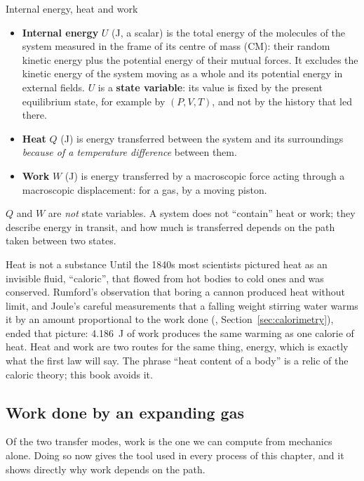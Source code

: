 \begin{defbox}{Internal energy, heat and work}
\begin{itemize}
\item \textbf{Internal energy} $U$ (\si{J}, a scalar) is the total energy of the molecules of the system
      measured in the frame of its centre of mass (CM): their random kinetic energy plus the potential
      energy of their mutual forces. It excludes the kinetic energy of the system moving as a whole and
      its potential energy in external fields. $U$ is a \textbf{state variable}: its value is fixed by the
      present equilibrium state, for example by $(P,V,T)$, and not by the history that led there.
\item \textbf{Heat} $Q$ (\si{J}) is energy transferred between the system and its surroundings
      \emph{because of a temperature difference} between them.
\item \textbf{Work} $W$ (\si{J}) is energy transferred by a macroscopic force acting through a macroscopic
      displacement: for a gas, by a moving piston.
\end{itemize}
$Q$ and $W$ are \emph{not} state variables. A system does not ``contain'' heat or work; they describe
energy in transit, and how much is transferred depends on the path taken between two states.
\end{defbox}

\begin{remarkbox}{Heat is not a substance}
Until the 1840s most scientists pictured heat as an invisible fluid, ``caloric'', that flowed from hot
bodies to cold ones and was conserved. Rumford's observation that boring a cannon produced heat without limit, and Joule's careful measurements that a falling weight stirring water warms it by an amount proportional to the work done (, Section~\ref{sec:calorimetry}), ended that picture: \SI{4.186}{J} of work produces the same warming as one calorie of heat. Heat and work are two routes for the same thing, energy, which is exactly what
the first law will say. The phrase ``heat content of a body'' is a relic of the caloric theory; this book
avoids it.
\end{remarkbox}

\subsection{Work done by an expanding gas}

Of the two transfer modes, work is the one we can compute from mechanics alone. Doing so now gives the
tool used in every process of this chapter, and it shows directly why work depends on the path.

